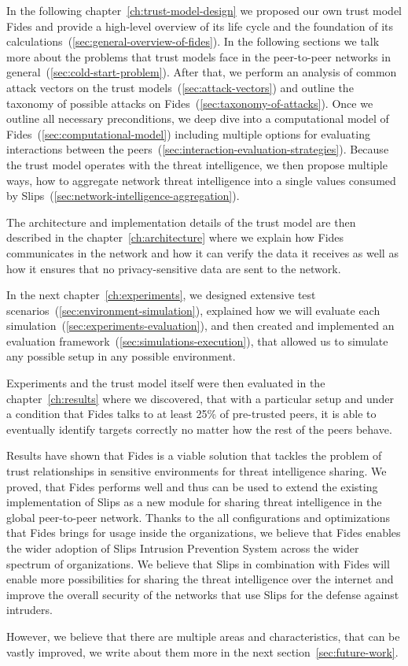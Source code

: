 In the following chapter~\ref{ch:trust-model-design} we proposed our own trust model Fides and provide a high-level overview of its life cycle and the foundation of its calculations~(\ref{sec:general-overview-of-fides}).
In the following sections we talk more about the problems that trust models face in the peer-to-peer networks in general~(\ref{sec:cold-start-problem}).
After that, we perform an analysis of common attack vectors on the trust models~(\ref{sec:attack-vectors}) and outline the taxonomy of possible attacks on Fides~(\ref{sec:taxonomy-of-attacks}).
Once we outline all necessary preconditions, we deep dive into a computational model of Fides~(\ref{sec:computational-model}) including multiple options for evaluating interactions between the peers~(\ref{sec:interaction-evaluation-strategies}).
Because the trust model operates with the threat intelligence, we then propose multiple ways, how to aggregate network threat intelligence into a single values consumed by Slips~(\ref{sec:network-intelligence-aggregation}).

The architecture and implementation details of the trust model are then described in the chapter~\ref{ch:architecture} where we explain how Fides communicates in the network and how it can verify the data it receives as well as how it ensures that no privacy-sensitive data are sent to the network.

In the next chapter~\ref{ch:experiments}, we designed extensive test scenarios~(\ref{sec:environment-simulation}), explained how we will evaluate each simulation~(\ref{sec:experiments-evaluation}), and then created and implemented an evaluation framework~(\ref{sec:simulations-execution}), that allowed us to simulate any possible setup in any possible environment.

Experiments and the trust model itself were then evaluated in the chapter~\ref{ch:results} where we discovered, that with a particular setup and under a condition that Fides talks to at least 25\% of pre-trusted peers, it is able to eventually identify targets correctly no matter how the rest of the peers behave.

Results have shown that Fides is a viable solution that tackles the problem of trust relationships in sensitive environments for threat intelligence sharing. 
We proved, that Fides performs well and thus can be used to extend the existing implementation of Slips as a new module for sharing threat intelligence in the global peer-to-peer network.
Thanks to the all configurations and optimizations that Fides brings for usage inside the organizations, we believe that Fides enables the wider adoption of Slips Intrusion Prevention System across the wider spectrum of organizations.
We believe that Slips in combination with Fides will enable more possibilities for sharing the threat intelligence over the internet and improve the overall security of the networks that use Slips for the defense against intruders.

However, we believe that there are multiple areas and characteristics, that can be vastly improved, we write about them more in the next section~\ref{sec:future-work}.

